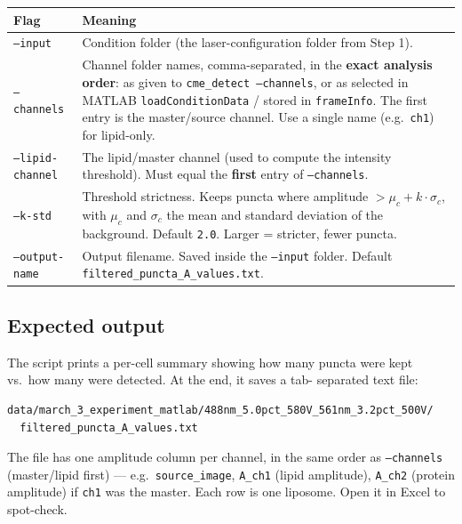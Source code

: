 \documentclass[11pt]{article}
\newcommand{\code}[1]{\texttt{#1}}
\newcommand{\flag}[1]{\texttt{#1}}
\begin{document}
\begin{tabularx}{\linewidth}{l X}
\toprule
\textbf{Flag} & \textbf{Meaning} \\
\midrule
\flag{--input}         & Condition folder (the laser-configuration
                         folder from Step 1). \\
\flag{--channels}      & Channel folder names, comma-separated, in the
                         \textbf{exact analysis order}: as given to
                         \code{cme\_detect --channels}, or as selected
                         in MATLAB \code{loadConditionData} / stored in
                         \code{frameInfo}. The first entry is the
                         master/source channel. Use a single name
                         (e.g.\ \code{ch1}) for lipid-only. \\
\flag{--lipid-channel} & The lipid/master channel (used to compute
                         the intensity threshold). Must equal the
                         \textbf{first} entry of \code{--channels}. \\
\flag{--k-std}         & Threshold strictness. Keeps puncta where
                         amplitude $> \mu_c + k \cdot \sigma_c$, with
                         $\mu_c$ and $\sigma_c$ the mean and standard
                         deviation of the background. Default
                         \code{2.0}. Larger = stricter, fewer puncta. \\
\flag{--output-name}   & Output filename. Saved inside the
                         \code{--input} folder. Default
                         \code{filtered\_puncta\_A\_values.txt}. \\
\bottomrule
\end{tabularx}

\subsection*{Expected output}

The script prints a per-cell summary showing how many puncta were
kept vs.\ how many were detected. At the end, it saves a tab-
separated text file:

\begin{lstlisting}
data/march_3_experiment_matlab/488nm_5.0pct_580V_561nm_3.2pct_500V/
  filtered_puncta_A_values.txt
\end{lstlisting}

The file has one amplitude column per channel, in the same order as
\code{--channels} (master/lipid first) --- e.g.\
\code{source\_image}, \code{A\_ch1} (lipid amplitude), \code{A\_ch2}
(protein amplitude) if \code{ch1} was the master. Each row is one
liposome. Open it in Excel to spot-check.
\end{document}
